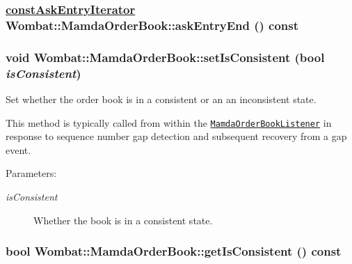 \hypertarget{classWombat_1_1MamdaOrderBook_33638ee5601d031be5428b5e56e8641b}{
\subsubsection[askEntryEnd]{\setlength{\rightskip}{0pt plus 5cm}\hyperlink{classWombat_1_1MamdaOrderBook_1_1askEntryIterator}{const\-Ask\-Entry\-Iterator} Wombat::Mamda\-Order\-Book::ask\-Entry\-End () const}}
\label{classWombat_1_1MamdaOrderBook_33638ee5601d031be5428b5e56e8641b}


\hypertarget{classWombat_1_1MamdaOrderBook_eb98ce2769476a0051efc840bcf5fd27}{
\subsubsection[setIsConsistent]{\setlength{\rightskip}{0pt plus 5cm}void Wombat::Mamda\-Order\-Book::set\-Is\-Consistent (bool {\em is\-Consistent})}}
\label{classWombat_1_1MamdaOrderBook_eb98ce2769476a0051efc840bcf5fd27}


Set whether the order book is in a consistent or an an inconsistent state. 

This method is typically called from within the {\tt \hyperlink{classWombat_1_1MamdaOrderBookListener}{Mamda\-Order\-Book\-Listener}} in response to sequence number gap detection and subsequent recovery from a gap event.

\begin{Desc}
\item[Parameters:]
\begin{description}
\item[{\em is\-Consistent}]Whether the book is in a consistent state. \end{description}
\end{Desc}
\hypertarget{classWombat_1_1MamdaOrderBook_faac1ded1eefd6cc50dfcddc29f106b4}{
\subsubsection[getIsConsistent]{\setlength{\rightskip}{0pt plus 5cm}bool Wombat::Mamda\-Order\-Book::get\-Is\-Consistent () const}}
\label{classWombat_1_1MamdaOrderBook_faac1ded1eefd6cc50dfcddc29f106b4}



